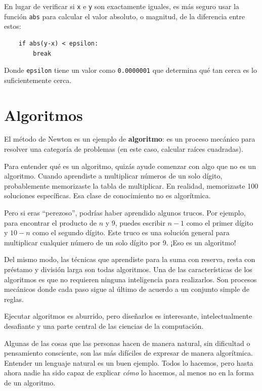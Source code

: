 \documentclass[10pt]{book}
\begin{document}
En lugar de verificar si {\tt x} e {\tt y} son exactamente iguales, es
más seguro usar la función {\tt abs} para calcular el
valor absoluto, o magnitud, de la diferencia entre estos:

\begin{verbatim}
    if abs(y-x) < epsilon:
        break
\end{verbatim}
%
Donde \verb"epsilon" tiene un valor como {\tt 0.0000001} que
determina qué tan cerca es lo suficientemente cerca.


\section{Algoritmos}

El método de Newton es un ejemplo de {\bf algoritmo}: es un
proceso mecánico para resolver una categoría de problemas (en este
caso, calcular raíces cuadradas).

Para entender qué es un algoritmo, quizás ayude comenzar con
algo que no es un algoritmo.  Cuando aprendiste a multiplicar
números de un solo dígito, probablemente memorizaste la tabla de multiplicar.
En realidad, memorizaste 100 soluciones específicas.  Esa clase de
conocimiento no es algorítmica.

Pero si eras ``perezoso'', podrías haber aprendido algunos
trucos.  Por ejemplo, para encontrar el producto de $n$ y 9, puedes
escribir $n-1$ como el primer dígito y $10-n$ como el segundo
dígito.  Este truco es una solución general para multiplicar cualquier
número de un solo dígito por 9.  ¡Eso es un algoritmo!

Del mismo modo, las técnicas que aprendiste para la suma con reserva,
resta con préstamo y división larga son todas algoritmos.  Una
de las características de los algoritmos es que no requieren ninguna
inteligencia para realizarlos.  Son procesos mecánicos donde
cada paso sigue al último de acuerdo a un conjunto simple de reglas.

Ejecutar algoritmos es aburrido, pero diseñarlos es interesante,
intelectualmente desafiante y una parte central de las ciencias de la computación.

Algunas de las cosas que las personas hacen de manera natural, sin dificultad o
pensamiento consciente, son las más difíciles de expresar de manera algorítmica.
Entender un lenguaje natural es un buen ejemplo.  Todos lo hacemos, pero
hasta ahora nadie ha sido capaz de explicar {\em cómo} lo hacemos, al menos
no en la forma de un algoritmo.
\end{document}
